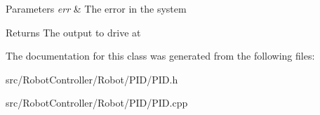 \begin{DoxyParams}{Parameters}
{\em err} & The error in the system\\
\hline
\end{DoxyParams}
\begin{DoxyReturn}{Returns}
The output to drive at 
\end{DoxyReturn}


The documentation for this class was generated from the following files\+:\begin{DoxyCompactItemize}
\item 
src/\+Robot\+Controller/\+Robot/\+P\+I\+D/P\+I\+D.\+h\item 
src/\+Robot\+Controller/\+Robot/\+P\+I\+D/P\+I\+D.\+cpp\end{DoxyCompactItemize}
